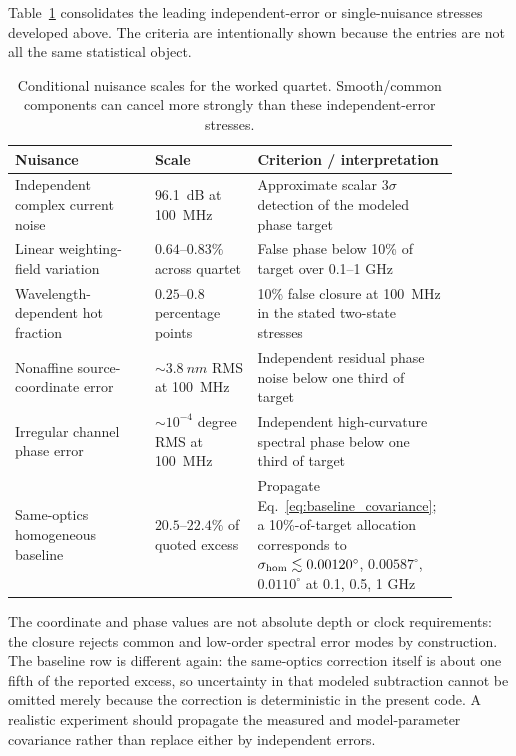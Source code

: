 \documentclass[11pt]{article}
\begin{document}
Table~\ref{tab:nuisance_budget} consolidates the leading independent-error or single-nuisance stresses developed above. The criteria are intentionally shown because the entries are not all the same statistical object.
\begin{table}[H]
\centering
\caption{Conditional nuisance scales for the worked quartet. Smooth/common components can cancel more strongly than these independent-error stresses.}
\label{tab:nuisance_budget}
\begin{tabular}{p{0.30\linewidth}p{0.22\linewidth}p{0.36\linewidth}}
\toprule
Nuisance & Scale & Criterion / interpretation \\
\midrule
Independent complex current noise & \SI{96.1}{dB} at \SI{100}{MHz} & Approximate scalar $3\sigma$ detection of the modeled phase target \\
Linear weighting-field variation & $0.64$--$0.83\%$ across quartet & False phase below 10\% of target over 0.1--1 GHz \\
Wavelength-dependent hot fraction & $0.25$--$0.8$ percentage points & 10\% false closure at \SI{100}{MHz} in the stated two-state stresses \\
Nonaffine source-coordinate error & $\sim3.8~\si{nm}$ RMS at \SI{100}{MHz} & Independent residual phase noise below one third of target \\
Irregular channel phase error & $\sim10^{-4}$ degree RMS at \SI{100}{MHz} & Independent high-curvature spectral phase below one third of target \\
Same-optics homogeneous baseline & $20.5$--$22.4\%$ of quoted excess & Propagate Eq.~\eqref{eq:baseline_covariance}; a 10\%-of-target allocation corresponds to $\sigma_{\rm hom}\lesssim0.00120^\circ$, $0.00587^\circ$, $0.0110^\circ$ at 0.1, 0.5, 1 GHz \\
\bottomrule
\end{tabular}
\end{table}
The coordinate and phase values are not absolute depth or clock requirements: the closure rejects common and low-order spectral error modes by construction. The baseline row is different again: the same-optics correction itself is about one fifth of the reported excess, so uncertainty in that modeled subtraction cannot be omitted merely because the correction is deterministic in the present code. A realistic experiment should propagate the measured and model-parameter covariance rather than replace either by independent errors.
\end{document}
